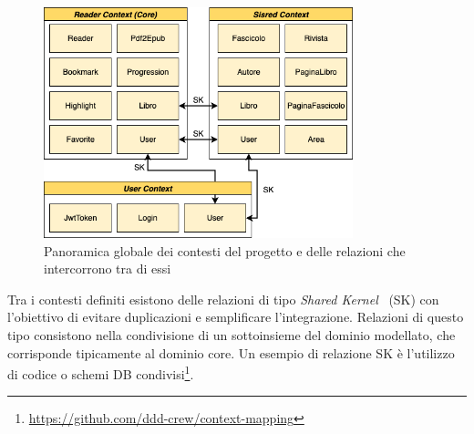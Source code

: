 \begin{figure}[H]
    \centering
    \includegraphics[width=0.8\textwidth]{img/ddd-context-map.png}
    \caption{Panoramica globale dei contesti del progetto e delle relazioni che intercorrono tra di essi}
\end{figure}

Tra i contesti definiti esistono delle relazioni di tipo \textit{Shared Kernel}~\cite{evans_domain-driven_2004} (SK) con l'obiettivo di evitare duplicazioni e semplificare l'integrazione. Relazioni di questo tipo consistono nella condivisione di un sottoinsieme del dominio modellato, che corrisponde tipicamente al dominio core. Un esempio di relazione SK è l'utilizzo di codice o schemi DB condivisi\footnote{\href{https://github.com/ddd-crew/context-mapping}{https://github.com/ddd-crew/context-mapping}}.

